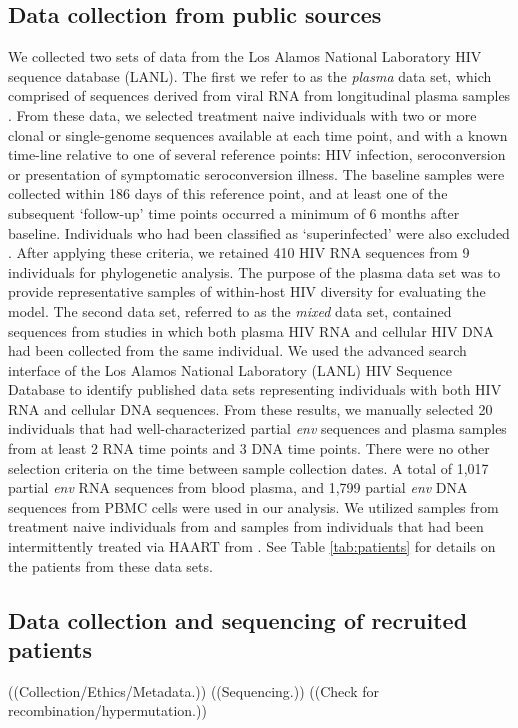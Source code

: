 \documentclass[12pt,onecolumn,twoside]{pnas-new}
\begin{document}
{\subsection*{Data collection from public sources}
We collected two sets of data from the Los Alamos National Laboratory HIV sequence database (LANL).
The first we refer to as the {\em plasma} data set, which comprised of sequences derived from viral RNA from longitudinal plasma samples \cite{McCloskey14}. 
From these data, we selected treatment naive individuals with two or more clonal or single-genome sequences available at each time point, and with a known time-line relative to one of several reference points: HIV infection, seroconversion or presentation of symptomatic seroconversion illness. 
The baseline samples were collected within 186 days of this reference point, and at least one of the subsequent `follow-up' time points occurred a minimum of 6 months after baseline.
Individuals who had been classified as `superinfected' were also excluded \cite{McCloskey14}.
After applying these criteria, we retained 410 HIV RNA sequences from 9 individuals for phylogenetic analysis.
The purpose of the plasma data set was to provide representative samples of within-host HIV diversity for evaluating the model.
The second data set, referred to as the {\em mixed} data set, contained sequences from studies in which both plasma HIV RNA and cellular HIV DNA had been collected from the same individual.
We used the advanced search interface of the Los Alamos National Laboratory (LANL) HIV Sequence Database \cite{LosAlamos} to identify published data sets representing individuals with both HIV RNA and cellular DNA sequences.
From these results, we manually selected 20 individuals that had well-characterized partial {\em env} sequences and plasma samples from at least 2 RNA time points and 3 DNA time points. 
There were no other selection criteria on the time between sample collection dates. 
A total of 1,017 partial {\em env} RNA sequences from blood plasma, and 1,799 partial {\em env} DNA sequences from PBMC cells were used in our analysis. 
We utilized samples from treatment naive individuals from \cite{Shankarappa99, Novitsky09} and samples from individuals that had been intermittently treated via HAART from \cite{Llewellyn06,Fischer04}. 
See Table \ref{tab:patients} for details on the patients from these data sets.
\subsection*{Data collection and sequencing of recruited patients}
((Collection/Ethics/Metadata.))
((Sequencing.))
((Check for recombination/hypermutation.))
}
\end{document}
